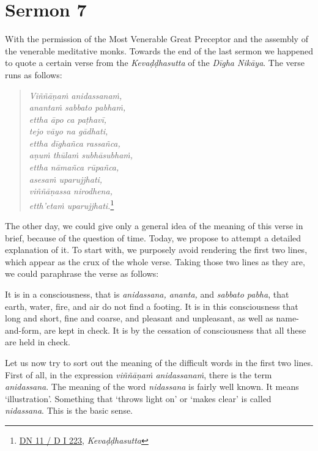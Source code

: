 \chapter{Sermon 7}

\NibbanaOpeningQuote

With the permission of the Most Venerable Great Preceptor and the assembly of the venerable meditative monks. Towards the end of the last sermon we happened to quote a certain verse from the \emph{Kevaḍḍhasutta} of the \emph{Dīgha Nikāya}. The verse runs as follows:

\begin{quote}
\emph{Viññāṇaṁ anidassanaṁ,}\\
\emph{anantaṁ sabbato pabhaṁ,}\\
\emph{ettha āpo ca paṭhavī,}\\
\emph{tejo vāyo na gādhati,}\\
\emph{ettha dīghañca rassañca,}\\
\emph{aṇuṁ thūlaṁ subhāsubhaṁ,}\\
\emph{ettha nāmañca rūpañca,}\\
\emph{asesaṁ uparujjhati,}\\
\emph{viññāṇassa nirodhena,}\\
\emph{etth'etaṁ uparujjhati.}\footnote{\href{https://suttacentral.net/dn11/pli/ms}{DN 11 / D I 223}, \emph{Kevaḍḍhasutta}}
\end{quote}

The other day, we could give only a general idea of the meaning of this verse in brief, because of the question of time. Today, we propose to attempt a detailed explanation of it. To start with, we purposely avoid rendering the first two lines, which appear as the crux of the whole verse. Taking those two lines as they are, we could paraphrase the verse as follows:

It is in a consciousness, that is \emph{anidassana, ananta,} and \emph{sabbato pabha}, that earth, water, fire, and air do not find a footing. It is in this consciousness that long and short, fine and coarse, and pleasant and unpleasant, as well as name-and-form, are kept in check. It is by the cessation of consciousness that all these are held in check.

Let us now try to sort out the meaning of the difficult words in the first two lines. First of all, in the expression \emph{viññāṇaṁ anidassanaṁ}, there is the term \emph{anidassana}. The meaning of the word \emph{nidassana} is fairly well known. It means `illustration'. Something that `throws light on' or `makes clear' is called \emph{nidassana}. This is the basic sense.

